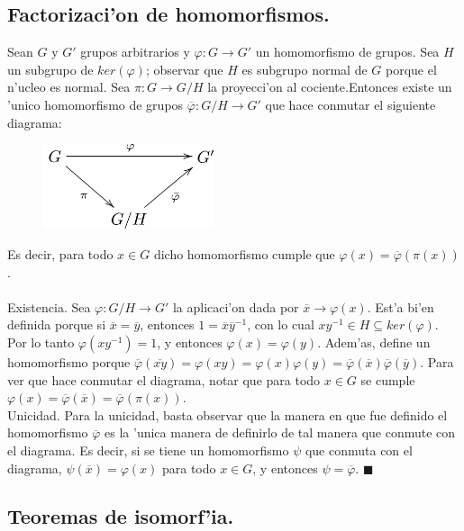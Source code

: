 \documentclass[a4paper,openright,12pt]{report}
\numberwithin{equation}{section} %
\newenvironment{proof}{\noindent{\it Demostracion:}}{\hfill$\blacksquare$} %
\begin{document}
\subsection{Factorizaci'on de homomorfismos.}
Sean $G$ y $G'$ grupos arbitrarios y $\varphi:G\rightarrow G'$ un homomorfismo de grupos. Sea $H$ un subgrupo de $ker(\varphi)$; observar que $H$ es subgrupo normal de $G$ porque el n'ucleo es normal. Sea $\pi:G \rightarrow G/H$ la proyecci'on al cociente.Entonces existe un 'unico homomorfismo de grupos $\overline{\varphi}:G/H \rightarrow G'$ que hace conmutar el siguiente diagrama:
\begin{figure}[H]
\centering
\includegraphics[width=5cm]{./factorizacion.png}
\end{figure}
Es decir, para todo $x \in G $ dicho homomorfismo cumple que $\varphi(x)=\overline{\varphi}(\pi(x))$.
\\
\\
\begin{proof}
Existencia. Sea $\varphi:G/H \rightarrow G'$ la aplicaci'on dada por $\overline{x}\rightarrow \varphi(x)$. Est'a bi'en definida porque si $\overline{x}=\overline{y}$, entonces $1=\overline{x}\overline{y}^{-1}$, con lo cual $xy^{-1}\in H \subseteq ker(\varphi)$. Por lo tanto $\varphi(xy^{-1})=1$, y entonces $\varphi(x)=\varphi(y)$. Adem'as, define un homomorfismo porque $\overline{\varphi}(\overline{xy})=\varphi(xy)=\varphi(x)\varphi(y)=\overline{\varphi}(\overline{x})\overline{\varphi}(\overline{y})$. Para ver que hace conmutar el diagrama, notar que para todo $x \in G$ se cumple $\varphi(x)=\overline{\varphi}(\overline{x})=\overline{\varphi}(\pi(x))$.\\
Unicidad. Para la unicidad, basta observar que la manera en que fue definido el homomorfismo $\overline{\varphi}$ es la 'unica manera de definirlo de tal manera que conmute con el diagrama. Es decir, si se tiene un homomorfismo $\psi$ que conmuta con el diagrama, $\psi(\overline{x})=\varphi(x)$ para todo $x \in G$, y entonces $\psi = \overline{\varphi}$.
\end{proof}

\subsection{Teoremas de isomorf'ia.}
\end{document}
